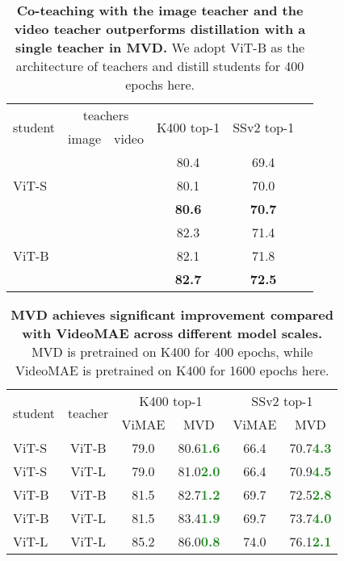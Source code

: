\documentclass[10pt,twocolumn,letterpaper]{article}
\makeatletter
\newcommand*{\system}{MVD\@\xspace}
\newcommand{\cmark}{\ding{51}}
\newcommand{\xmark}{\ding{55}}
\newcommand{\Up}[1]{\textcolor{ForestGreen}{\xspace\small{\bf #1}}}
\newcommand{\tablestyle}[2]{\setlength{\tabcolsep}{#1}\renewcommand{\arraystretch}{#2}\centering\small}
\makeatother
\begin{document}
\begin{table}[t]
\centering
\begin{tabular}{l|c|c|c|c|c}
\multicolumn{1}{l|}{\multirow{2}{*}{student}} & \multicolumn{2}{c|}{teachers} & \multicolumn{1}{l|}{\multirow{2}{*}{K400 top-1}} & \multicolumn{1}{c|}{\multirow{2}{*}{SSv2 top-1}}            \\ 
\cline{2-3} \multicolumn{1}{l|}{} & \multicolumn{1}{l|}{image} & \multicolumn{1}{l|}{video} & \multicolumn{1}{l|}{} & \multicolumn{1}{l|}{}      \\ 
\shline
 & \cmark & \xmark & 80.4  & 69.4 \\
ViT-S & \xmark & \cmark & 80.1 & 70.0 \\
 & \cmark & \cmark & \textbf{80.6}  & \textbf{70.7} \\
\hline
 & \cmark & \xmark & 82.3 & 71.4 \\
ViT-B & \xmark & \cmark & 82.1 & 71.8 \\
 & \cmark & \cmark & \textbf{82.7} & \textbf{72.5} \\
\end{tabular}
\vspace{-2pt}
\caption{\textbf{Co-teaching with the image teacher and the video teacher outperforms distillation with a single teacher in \system.} We adopt ViT-B as the architecture of teachers and distill students for 400 epochs here.}
\label{tab:diff_teacher}
\vspace{-5pt}
\end{table}



\begin{table}[t]
\centering
\tablestyle{5pt}{1.05}
\begin{tabular}{lc|c|c|c|c}
\multicolumn{1}{l}{\multirow{2}{*}{student}} & \multicolumn{1}{l|}{\multirow{2}{*}{teacher}} & \multicolumn{2}{c|}{K400 top-1} & \multicolumn{2}{c}{SSv2 top-1}            \\ \cline{3-6} 
\multicolumn{1}{l}{}                               & \multicolumn{1}{l|}{}                               & \multicolumn{1}{l|}{ViMAE} & MVD    & \multicolumn{1}{l|}{ViMAE} & MVD        \\ 
\shline
ViT-S & ViT-B & 79.0 & 80.6\Up{1.6} & 66.4 & 70.7\Up{4.3} \\
ViT-S & ViT-L &  79.0 & 81.0\Up{2.0} & 66.4 & 70.9\Up{4.5}   \\
\hline
ViT-B & ViT-B & 81.5 & 82.7\Up{1.2} & 69.7 & 72.5\Up{2.8} \\
ViT-B & ViT-L & 81.5 & 83.4\Up{1.9} & 69.7 & 73.7\Up{4.0} \\
\hline
ViT-L & ViT-L & 85.2 & 86.0\Up{0.8} & 74.0 & 76.1\Up{2.1} \\
\end{tabular}
\caption{\textbf{MVD achieves significant improvement compared with VideoMAE across different model scales.} MVD is pretrained on K400 for 400 epochs, while VideoMAE is pretrained on K400 for 1600 epochs here.}
\label{tab:diff_size}
\vspace{-5pt}
\end{table}
\end{document}
